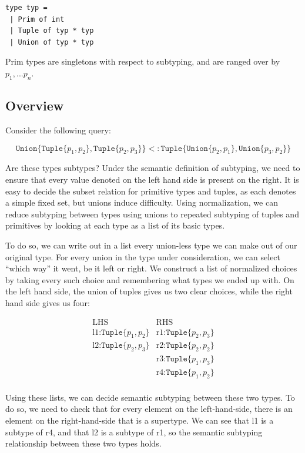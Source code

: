 \documentclass[a4paper,english]{lipics-v2019}
\newcommand{\xt}[1]{\texttt{#1}}
\newcommand{\union}[2]{\xt{Union\{}#1,#2\xt{\}}}
\newcommand{\tuple}[1]{\xt{Tuple\{}#1\xt{\}}}
\begin{document}
\begin{lstlisting}
type typ =
 | Prim of int
 | Tuple of typ * typ
 | Union of typ * typ
\end{lstlisting}

Prim types are singletons with respect to subtyping, and are ranged over by
\(p_1, ... p_n\).

\subsection{Overview}

Consider the following query:

\[
\union{ \tuple{p_1,p_2}}{\tuple{p_2,p_3}}  <:  \tuple{ \union{p_2}{p_1}, \union{p_3}{p_2}}
\]

Are these types subtypes? Under the semantic definition of subtyping, we need
to ensure that every value denoted on the left hand side is present on the
right. It is easy to decide the subset relation for primitive types and tuples, 
as each denotes a simple fixed set, but unions induce difficulty. Using normalization,
we can reduce subtyping between types using unions to repeated subtyping of tuples and
primitives by looking at each type as a list of its basic types.

To do so, we can write out in a list every union-less type we can make out of our original type.
For every union in the type under consideration, we can select ``which way'' it went, be it left
or right. We construct a list of normalized choices by taking every such choice and remembering
what types we ended up with. On the left hand side, the union of tuples gives us two clear
choices, while the right hand side gives us four:

\[
\begin{array}{r|l}
\text{LHS} & \text{RHS} \\
\hline
\text{l1:} \tuple{p_1,p_2} & \text{r1:} \tuple{p_2,p_3}\\
\text{l2:} \tuple{p_2,p_3} & \text{r2:} \tuple{p_2,p_2}\\
                    & \text{r3:} \tuple{p_1,p_3}\\
                    & \text{r4:} \tuple{p_1,p_2}\\
\end{array}
\]

Using these lists, we can decide semantic subtyping between these two
types. To do so, we need to check that for every element on the left-hand-side,
there is an element on the right-hand-side that is a supertype. We can 
see that l1 is a subtype of r4, and that l2 is a subtype of r1, so the
semantic subtyping relationship between these two types holds.
\end{document}
